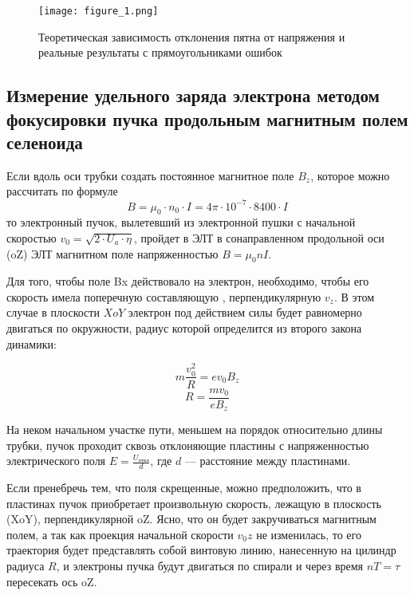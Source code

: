 \begin{figure}[h!]
	\centering
	\texttt{[image: figure\_1.png]}
	\caption{Теоретическая зависимость отклонения пятна от напряжения и реальные результаты с прямоугольниками ошибок}
	\label{fig:figure1}
\end{figure}

\newpage

\subsection{Измерение удельного заряда электрона методом фокусировки пучка продольным магнитным полем селеноида}

Если вдоль оси трубки создать постоянное магнитное поле $B_z$, которое можно рассчитать по формуле
\begin{equation}
	B=\mu_0\cdot{}n_0\cdot{}I=4\pi\cdot10^{-7}\cdot8400\cdot{}I
\end{equation}
то электронный пучок, вылетевший из электронной пушки с начальной скоростью $v_0=\sqrt{2\cdot{U_a}\cdot\eta}$, пройдет в ЭЛТ в сонаправленном продольной оси (oZ) ЭЛТ магнитном поле напряженностью $B=\mu_0nI$. 

Для того, чтобы поле Bx действовало на электрон, необходимо, чтобы его скорость имела поперечную составляющую , перпендикулярную $v_z$. В этом случае в плоскости $XoY$ электрон под действием силы  будет равномерно двигаться по окружности, радиус которой определится из второго закона динамики:

\begin{equation}
	m\frac{v_0^2}{R}=ev_0B_z
\end{equation}
\begin{equation}
	R=\frac{mv_0}{eB_z}
\end{equation}

На неком начальном участке пути, меньшем на порядок относительно длины трубки, пучок проходит сквозь отклоняющие пластины с напряженностью электрического поля $E=\frac{U_\text{откл}}{d}$, где $d$ --- расстояние между пластинами.

Если пренебречь тем, что поля скрещенные, можно предположить, что в пластинах пучок приобретает произвольную скорость, лежащую в плоскость (XoY), перпендикулярной oZ. Ясно, что он будет закручиваться магнитным полем, а так как проекция начальной скорости $v_0z$ не изменилась, то
его траектория будет представлять собой винтовую линию, нанесенную на цилиндр радиуса $R$, и электроны пучка будут двигаться по спирали и через время $nT=\tau$ пересекать ось oZ.

